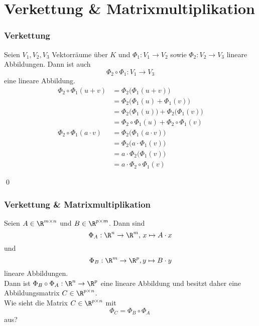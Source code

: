 \section{Verkettung \& Matrixmultiplikation}
\makeSectionDividerPage
%
\begin{frame}\frametitle{Verkettung}
	
	\vspace{2mm}
	Seien $V_1, V_2, V_3$ Vektorräume über $K$ und 
	$\Phi_1: V_1 \to V_2$ sowie $\Phi_2:V_2\to V_3$ lineare Abbildungen.
	Dann ist auch
	$$
		\Phi_2\circ\Phi_1: V_1 \to V_3
	$$
	eine lineare Abbildung.\\[3mm]
	\pause
	\begin{align*}
		\Phi_2\circ\Phi_1(u+v) 
			&= \Phi_2\big( \Phi_1(u+v) \big) 			\\
			&= \Phi_2\big( \Phi_1(u) + \Phi_1(v) \big)	\\
			&= \Phi_2\big( \Phi_1(u) \big) + \Phi_2\big( \Phi_1(v) \big)	\\
			&= \Phi_2\circ\Phi_1(u) + \Phi_2\circ\Phi_1(v)	\\[1mm]
		\Phi_2\circ\Phi_1(a\cdot v) 
			&= \Phi_2\big( \Phi_1(a\cdot v) \big) 		\\
			&= \Phi_2\big( a\cdot \Phi_1(v) \big) 		\\
			&= a\cdot\Phi_2\big( \Phi_1(v) \big) 		\\
			&= a\cdot\Phi_2\circ\Phi_1(v)  		
	\end{align*}	
	
	\vspace{-3mm}\qed
	
\end{frame}
%
%
\begin{frame}\frametitle{Verkettung \& Matrixmultiplikation}
	
	Seien $A\in \R^{m\times n}$ und $B \in \R^{p\times m}$. 
	Dann sind
	$$
		\Phi_A: \R^n \to \R^m,\, x\mapsto A\cdot x
	$$
	und
	$$
		\Phi_B: \R^m\to \R^p, y\mapsto B\cdot y
	$$
	lineare Abbildungen.\\[3mm]
	\pause
	Dann ist $\Phi_B \circ \Phi_A: \R^n \to \R^p$ eine lineare Abbildung und besitzt daher eine Abbildungsmatrix $C \in \R^{p \times n}$.\pause\\
	Wie sieht die Matrix $C \in \R^{p\times n}$ mit
	$$
		\Phi_C = \Phi_B\circ \Phi_A\, 
	$$
	aus?
	


\end{frame}
%
%
